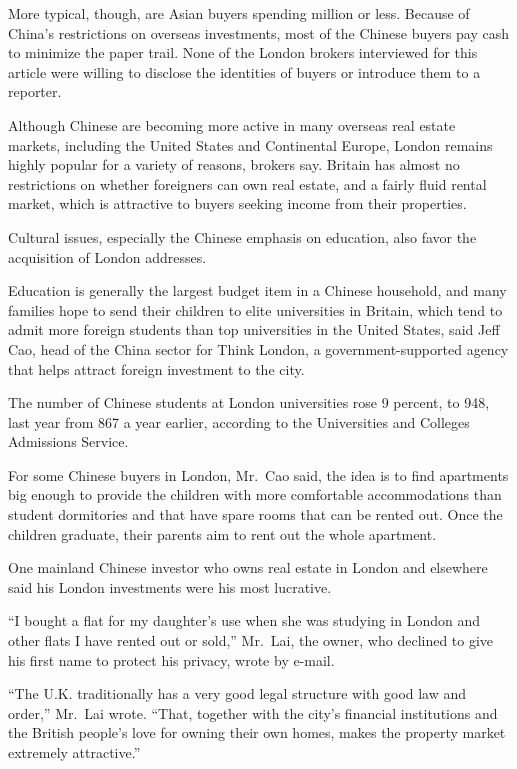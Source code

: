 ﻿\documentclass[12pt]{article}
\begin{document}
More typical, though, are Asian buyers spending  million or less. Because of China's
restrictions on overseas investments, most of the Chinese buyers pay cash to minimize the paper
trail. None of the London brokers interviewed for this article were willing to disclose the
identities of buyers or introduce them to a reporter.

Although Chinese are becoming more active in many overseas real estate markets, including the United
States and Continental Europe, London remains highly popular for a variety of reasons, brokers say.
Britain has almost no restrictions on whether foreigners can own real estate, and a fairly fluid
rental market, which is attractive to buyers seeking income from their properties.

Cultural issues, especially the Chinese emphasis on education, also favor the acquisition of London
addresses.

Education is generally the largest budget item in a Chinese household, and many families hope to
send their children to elite universities in Britain, which tend to admit more foreign students than
top universities in the United States, said Jeff Cao, head of the China sector for Think London, a
government-supported agency that helps attract foreign investment to the city.

The number of Chinese students at London universities rose 9 percent, to 948, last year from 867 a
year earlier, according to the Universities and Colleges Admissions Service.

For some Chinese buyers in London, Mr.~Cao said, the idea is to find apartments big enough to
provide the children with more comfortable accommodations than student dormitories and that have
spare rooms that can be rented out. Once the children graduate, their parents aim to rent out the
whole apartment.

One mainland Chinese investor who owns real estate in London and elsewhere said his London
investments were his most lucrative.

``I bought a flat for my daughter's use when she was studying in London and other flats I have
rented out or sold,'' Mr.~Lai, the owner, who declined to give his first name to protect his
privacy, wrote by e-mail.

``The U.K. traditionally has a very good legal structure with good law and order,'' Mr.~Lai wrote.
``That, together with the city's financial institutions and the British people's love for owning
their own homes, makes the property market extremely attractive.''
\end{document}
